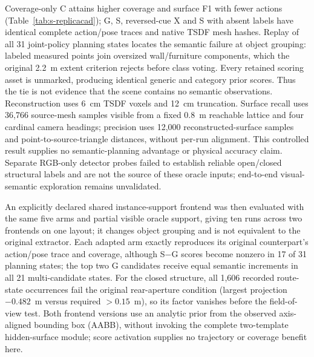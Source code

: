 Coverage-only C attains higher coverage and surface F1 with fewer actions (Table~\ref{tab:s-replicacad}); G, S, reversed-cue X and S with absent labels have identical complete action/pose traces and native TSDF mesh hashes. Replay of all 31 joint-policy planning states locates the semantic failure at object grouping: labeled measured points join oversized wall/furniture components, which the original 2.2~m extent criterion rejects before class voting. Every retained scoring asset is unmarked, producing identical generic and category prior scores. Thus the tie is not evidence that the scene contains no semantic observations. Reconstruction uses 6~cm TSDF voxels and 12~cm truncation. Surface recall uses 36,766 source-mesh samples visible from a fixed 0.8~m reachable lattice and four cardinal camera headings; precision uses 12,000 reconstructed-surface samples and point-to-source-triangle distances, without per-run alignment. This controlled result supplies no semantic-planning advantage or physical accuracy claim. Separate RGB-only detector probes failed to establish reliable open/closed structural labels and are not the source of these oracle inputs; end-to-end visual-semantic exploration remains unvalidated.

An explicitly declared shared instance-support frontend was then evaluated with the same five arms and partial visible oracle support, giving ten runs across two frontends on one layout; it changes object grouping and is not equivalent to the original extractor. Each adapted arm exactly reproduces its original counterpart's action/pose trace and coverage, although S$-$G scores become nonzero in 17 of 31 planning states; the top two G candidates receive equal semantic increments in all 21 multi-candidate states. For the closed structure, all 1,606 recorded route-state occurrences fail the original rear-aperture condition (largest projection $-0.482$~m versus required $>0.15$~m), so its factor vanishes before the field-of-view test. Both frontend versions use an analytic prior from the observed axis-aligned bounding box (AABB), without invoking the complete two-template hidden-surface module; score activation supplies no trajectory or coverage benefit here.
